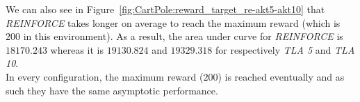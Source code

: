 We can also see in Figure~\ref{fig:CartPole:reward_target_re-akt5-akt10} that \textit{REINFORCE} takes longer on average to reach the maximum reward (which is $200$ in this environment). As a result, the area under curve for \textit{REINFORCE} is $18170.243$ whereas it is $19130.824$ and $19329.318$ for respectively \textit{TLA 5} and \textit{TLA 10}.\\
In every configuration, the maximum reward ($200$) is reached eventually and as such they have the same asymptotic performance.\\

